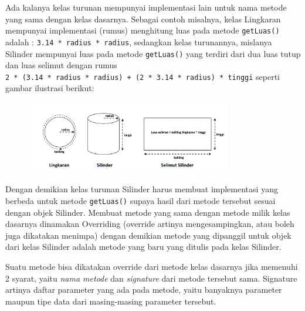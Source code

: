 Ada kalanya kelas turunan mempunyai implementasi lain untuk nama metode
yang sama dengan kelas dasarnya. Sebagai contoh misalnya, kelas
Lingkaran mempunyai implementasi (rumus) menghitung luas pada metode
\texttt{getLuas()} adalah : \texttt{3.14\ *\ radius\ *\ radius},
sedangkan kelas turunannya, mislanya Silinder mempunyai luas pada metode
\texttt{getLuas()} yang terdiri dari dua luas tutup dan luas selimut
dengan rumus
\texttt{2\ *\ (3.14\ *\ radius\ *\ radius)\ +\ (2\ *\ 3.14\ *\ radius)\ *\ tinggi}
seperti gambar ilustrasi berikut:

\begin{figure}[htbp]
\centering
\includegraphics[width=0.8\textwidth]{images/capture7-4.png}
\caption{}
\end{figure}

Dengan demikian kelas turunan Silinder harus membuat implementasi yang
berbeda untuk metode \texttt{getLuas()} supaya hasil dari metode
tersebut sesuai dengan objek Silinder. Membuat metode yang sama dengan
metode milik kelas dasarnya dinamakan Overriding (override artinya
mengesampingkan, atau boleh juga dikatakan menimpa) dengan demikian
metode yang dipanggil untuk objek dari kelas Silinder adalah metode yang
baru yang ditulis pada kelas Silinder.

Suatu metode bisa dikatakan override dari metode kelas dasarnya jika
memenuhi 2 syarat, yaitu \emph{nama metode} dan \emph{signature} dari
metode tersebut sama. Signature artinya daftar parameter yang ada pada
metode, yaitu banyaknya parameter maupun tipe data dari masing-masing
parameter tersebut.

